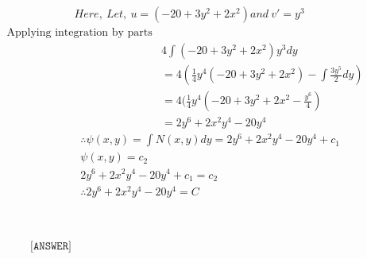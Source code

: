 \documentclass{article}
\begin{document}
\begin{homeworkProblem}
\begin{align*}
& Here,\: Let,\: u = (-20+3y^2 + 2x^2 ) and\: v'= y^3
      \end{align*}
      \pagebreak
      \begin{align*}
          \text{Applying integration by parts}\\
         & 4 \int (-20+3y^2 + 2x^2)y^3 dy\\
& = 4(\frac{1}{4}y^4 (-20+3y^2 + 2x^2 )- \int \frac{3y^5}{2}dy)\\
& = 4(\frac{1}{4}y^4 (-20+3y^2 +2x^2 - \frac{y^6}{4})\\
& = 2y^6 + 2x^2y^4-20y^4
      \end{align*}
      \begin{align*}
      & \therefore \psi (x,y) = \int N (x,y)dy = 2y^6 + 2x^2y^4-20y^4 +c_1\\
      & \psi (x,y) = c_2\\
      & 2y^6 + 2x^2y^4-20y^4 + c_1 = c_2\\
      &\therefore 2y^6 + 2x^2y^4-20y^4 = C\\
      \\ \\ \\ \\ \\ \\ \\ \\ 
    \texttt{[ANSWER]}
      \end{align*}
\end{homeworkProblem}
\pagebreak



                
\end{document}
